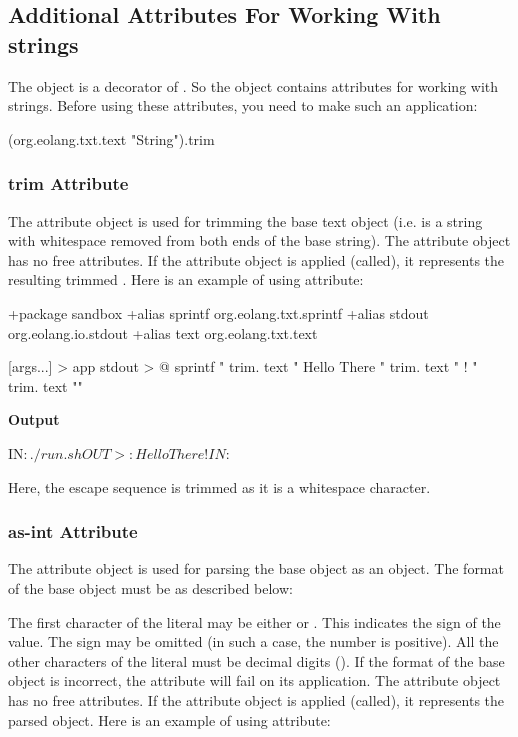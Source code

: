 \documentclass[12pt]{book}
\begin{document}
{\subsection{Additional Attributes For Working With strings}
The object  is a decorator of . So the  object contains attributes for working with strings. Before using these attributes, you need to make such an application:
\begin{ffcode}
(org.eolang.txt.text "String").trim
\end{ffcode}

\subsubsection{trim Attribute} 
The  attribute object is used for trimming the base text object (i.e.  is a string with whitespace removed from both ends of the base string).
The  attribute object has no free attributes.
If the  attribute object is applied (called), it represents the resulting trimmed . Here is an example of using  attribute:

\begin{ffcode}
+package sandbox
+alias sprintf org.eolang.txt.sprintf
+alias stdout org.eolang.io.stdout
+alias text org.eolang.txt.text

[args...] > app
  stdout > @
    sprintf
      "%
      trim.
        text "  Hello There  "
      trim.
        text "            !           "
      trim.
        text "\n"
\end{ffcode}
\textbf{Output}
\begin{ffcode}
IN$: ./run.sh
OUT>: Hello There!IN$: 
\end{ffcode}

Here, the \ff{\n} escape sequence is trimmed as it is a
whitespace character.

\subsubsection{as-int Attribute}
The  attribute object is used for parsing the base  object as an  object.
The format of the base  object must be as described below:

The first character of the  literal may be either \ff{+} or \ff{-}. This indicates the sign of the  value. The sign may be omitted (in such a case, the number is positive).
All the other characters of the  literal must be decimal digits ().
If the format of the base  object is incorrect, the  attribute will fail on its application.
The  attribute object has no free attributes.
If the  attribute object is applied (called), it represents the parsed  object. Here is an example of using  attribute:

}
\end{document}
